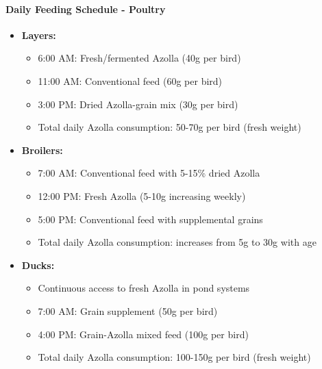 \paragraph{Daily Feeding Schedule - Poultry}
\begin{itemize}
    \item \textbf{Layers:}
    \begin{itemize}
        \item 6:00 AM: Fresh/fermented Azolla (40g per bird)
        \item 11:00 AM: Conventional feed (60g per bird)
        \item 3:00 PM: Dried Azolla-grain mix (30g per bird)
        \item Total daily Azolla consumption: 50-70g per bird (fresh weight)
    \end{itemize}
    \item \textbf{Broilers:}
    \begin{itemize}
        \item 7:00 AM: Conventional feed with 5-15\% dried Azolla
        \item 12:00 PM: Fresh Azolla (5-10g increasing weekly)
        \item 5:00 PM: Conventional feed with supplemental grains
        \item Total daily Azolla consumption: increases from 5g to 30g with age
    \end{itemize}
    \item \textbf{Ducks:}
    \begin{itemize}
        \item Continuous access to fresh Azolla in pond systems
        \item 7:00 AM: Grain supplement (50g per bird)
        \item 4:00 PM: Grain-Azolla mixed feed (100g per bird)
        \item Total daily Azolla consumption: 100-150g per bird (fresh weight)
    \end{itemize}
\end{itemize}

